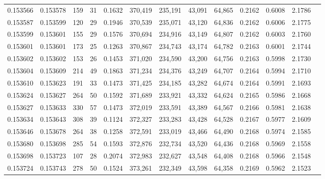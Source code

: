 \begin{tabular}{rrrrrrrrrrrrr}
0.153566 & 0.153578 &   159 &  31 &                                     0.1632 & 370,419 & 235,191 &  43,091 &  64,865 & 0.2162 & 0.6008 & 2.1786 \\
0.153587 & 0.153599 &   120 &  29 &                                     0.1946 & 370,539 & 235,071 &  43,120 &  64,836 & 0.2162 & 0.6006 & 2.1775 \\
0.153599 & 0.153601 &   155 &  29 &                                     0.1576 & 370,694 & 234,916 &  43,149 &  64,807 & 0.2162 & 0.6003 & 2.1760 \\
0.153601 & 0.153601 &   173 &  25 &                                     0.1263 & 370,867 & 234,743 &  43,174 &  64,782 & 0.2163 & 0.6001 & 2.1744 \\
0.153602 & 0.153602 &   153 &  26 &                                     0.1453 & 371,020 & 234,590 &  43,200 &  64,756 & 0.2163 & 0.5998 & 2.1730 \\
0.153604 & 0.153609 &   214 &  49 &                                     0.1863 & 371,234 & 234,376 &  43,249 &  64,707 & 0.2164 & 0.5994 & 2.1710 \\
0.153610 & 0.153623 &   191 &  33 &                                     0.1473 & 371,425 & 234,185 &  43,282 &  64,674 & 0.2164 & 0.5991 & 2.1693 \\
0.153624 & 0.153627 &   264 &  50 &                                     0.1592 & 371,689 & 233,921 &  43,332 &  64,624 & 0.2165 & 0.5986 & 2.1668 \\
0.153627 & 0.153633 &   330 &  57 &                                     0.1473 & 372,019 & 233,591 &  43,389 &  64,567 & 0.2166 & 0.5981 & 2.1638 \\
0.153634 & 0.153643 &   308 &  39 &                                     0.1124 & 372,327 & 233,283 &  43,428 &  64,528 & 0.2167 & 0.5977 & 2.1609 \\
0.153646 & 0.153678 &   264 &  38 &                                     0.1258 & 372,591 & 233,019 &  43,466 &  64,490 & 0.2168 & 0.5974 & 2.1585 \\
0.153680 & 0.153698 &   285 &  54 &                                     0.1593 & 372,876 & 232,734 &  43,520 &  64,436 & 0.2168 & 0.5969 & 2.1558 \\
0.153698 & 0.153723 &   107 &  28 &                                     0.2074 & 372,983 & 232,627 &  43,548 &  64,408 & 0.2168 & 0.5966 & 2.1548 \\
0.153724 & 0.153743 &   278 &  50 &                                     0.1524 & 373,261 & 232,349 &  43,598 &  64,358 & 0.2169 & 0.5962 & 2.1523 \\

\end{tabular}
